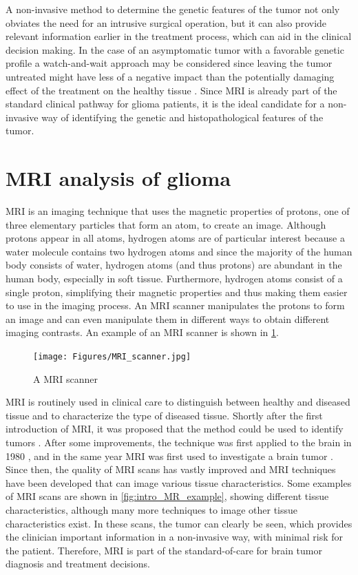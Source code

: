 A non-invasive method to determine the genetic features of the \gls{tumor} not only obviates the need for an intrusive surgical operation, but it can also provide relevant information earlier in the treatment process, which can aid in the clinical decision making.
In the case of an asymptomatic \gls{tumor} with a favorable genetic profile a watch-and-wait approach may be considered since leaving the \gls{tumor} untreated might have less of a negative impact than the potentially damaging effect of the treatment on the healthy tissue \autocite{vandenbent2012lggtreatment, welle2017EANO}.
Since \gls{MRI} is already part of the standard clinical pathway for glioma patients, it is the ideal candidate for a non-invasive way of identifying the genetic and histopathological features of the \gls{tumor}.

\section{MRI analysis of glioma}

\Acrfull{MRI} is an imaging technique that uses the magnetic properties of protons, one of three elementary particles that form an atom, to create an image.
Although protons appear in all atoms, hydrogen atoms are of particular interest because a water molecule contains two hydrogen atoms and since the majority of the human body consists of water, hydrogen atoms (and thus protons) are abundant in the human body, especially in soft tissue.
Furthermore, hydrogen atoms consist of a single proton, simplifying their magnetic properties and thus making them easier to use in the imaging process.
An \gls{MRI} scanner manipulates the protons to form an image and can even manipulate them in different ways to obtain different imaging contrasts.
An example of an \gls{MRI} scanner is shown in \cref{fig:intro_MR_machine}.


\begin{figure}[hbt]
    \centering
    \texttt{[image: Figures/MRI\_scanner.jpg]}
    \caption{A \acrfull{MRI} scanner}\label{fig:intro_MR_machine}
\end{figure}

\gls{MRI} is routinely used in clinical care to distinguish between healthy and diseased tissue and to characterize the type of diseased tissue.
Shortly after the first introduction of \gls{MRI}, it was proposed that the method could be used to identify \glspl{tumor} \autocite{damadian1971tumor}.
After some improvements, the technique was first applied to the brain in 1980 \autocite{holland1980brain}, and in the same year MRI was first used to investigate a brain \gls{tumor} \autocite{hawkes1980NMRbrain}.
Since then, the quality of \gls{MRI} scans has vastly improved and \gls{MRI} techniques have been developed that can image various tissue characteristics.
Some examples of \gls{MRI} scans are shown in \cref{fig:intro_MR_example}, showing different tissue characteristics, although many more techniques to image other tissue characteristics exist.
In these scans, the \gls{tumor} can clearly be seen, which provides the clinician important information in a non-invasive way, with minimal risk for the patient.
Therefore, \gls{MRI} is part of the standard-of-care for brain \gls{tumor} diagnosis and treatment decisions.

